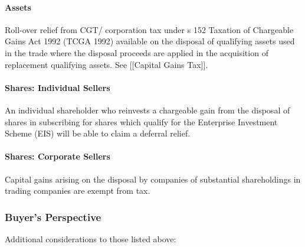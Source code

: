 \documentclass[
]{article}
\begin{document}
\hypertarget{assets}{%
\paragraph{Assets}\label{assets}}

Roll-over relief from CGT/ corporation tax under s 152 Taxation of
Chargeable Gains Act 1992 (TCGA 1992) available on the disposal of
qualifying assets used in the trade where the disposal proceeds are
applied in the acquisition of replacement qualifying assets. See
{[}{[}Capital Gains Tax{]}{]}.

\hypertarget{shares-individual-sellers}{%
\paragraph{Shares: Individual Sellers}\label{shares-individual-sellers}}

An individual shareholder who reinvests a chargeable gain from the
disposal of shares in subscribing for shares which qualify for the
Enterprise Investment Scheme (EIS) will be able to claim a deferral
relief.

\hypertarget{shares-corporate-sellers}{%
\paragraph{Shares: Corporate Sellers}\label{shares-corporate-sellers}}

Capital gains arising on the disposal by companies of substantial
shareholdings in trading companies are exempt from tax.

\hypertarget{buyers-perspective}{%
\subsubsection{Buyer's Perspective}\label{buyers-perspective}}

Additional considerations to those listed above:
\end{document}

